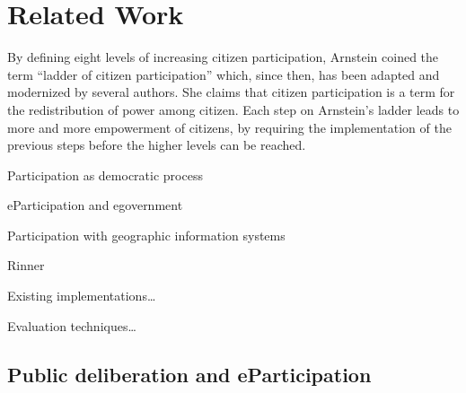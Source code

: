 \section{Related Work}
\label{chap:related_work}

By defining eight levels of increasing citizen participation, Arnstein \cite{Arnstein1969_citizen_participation} coined the term ``ladder of citizen participation'' which, since then, has been adapted and modernized \cite{Cai2009_spatial_annotation_deliberation,Connor1988_new_ladder,Collins2009_social_learning,carver2003future,you2009_participatory_map_based} by several authors. She claims that citizen participation is a term for the redistribution of power among citizen. Each step on Arnstein's ladder leads to more and more empowerment of citizens, by requiring the implementation of the previous steps before the higher levels can be reached.

Participation as democratic process \cite{Collins2009_social_learning}

\cite{Kent1998_dialogic_relationships_through_www}
\cite{Reddick2005_Citizen_interaction_with_egovernment}

eParticipation and egovernment \cite{Bimber1999_Citizen_communication_with_government} \cite{Jaeger2005_deliberate_democracy_and_egovernment}


Participation with geographic information systems \cite{Schlossberg2005} \cite{densham_sdss} \cite{Jankowski2005_community_based_pgis} \cite{Longueville2010_community_based_geoportals_web20}



Rinner\cite{Rinner_ArgumentationMaps}

Existing implementations\dots

Evaluation techniques\dots


\subsection{Public deliberation and eParticipation}

